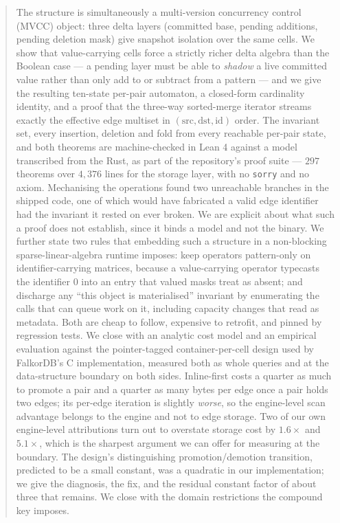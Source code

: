 \documentclass[11pt,a4paper]{article}
\theoremstyle{plain}
\theoremstyle{definition}
\theoremstyle{remark}
\begin{document}
\begin{abstract}
The structure is simultaneously a multi-version concurrency control (MVCC)
object: three delta layers (committed base, pending additions, pending
deletion mask) give snapshot isolation over the same cells. We show that
value-carrying cells force a strictly richer delta algebra than the
Boolean case --- a pending layer must be able to \emph{shadow} a live
committed value rather than only add to or subtract from a pattern --- and we
give the resulting ten-state per-pair automaton, a closed-form cardinality
identity, and a proof that the three-way sorted-merge iterator streams
exactly the effective edge multiset in $(\text{src},\text{dst},\text{id})$
order. The invariant set, every insertion, deletion and fold from every
reachable per-pair state, and both theorems are machine-checked in Lean 4
against a model transcribed from the Rust, as part of the repository's proof
suite --- $297$ theorems over $4{,}376$ lines for the storage layer, with no
\texttt{sorry} and no axiom. Mechanising the operations found two unreachable
branches in the shipped code, one of which would have fabricated a valid edge
identifier had the invariant it rested on ever broken. We are
explicit about what such a proof does not establish, since it binds a model and
not the binary. We further state two rules that embedding such a
structure in a non-blocking sparse-linear-algebra runtime imposes: keep
operators pattern-only on identifier-carrying matrices, because a
value-carrying operator typecasts the identifier $0$ into an entry that valued
masks treat as absent; and discharge any ``this object is materialised''
invariant by enumerating the calls that can queue work on it, including
capacity changes that read as metadata. Both are cheap to follow, expensive to
retrofit, and pinned by regression tests. We close with an
analytic cost model and an empirical evaluation against the pointer-tagged
container-per-cell design used by FalkorDB's C implementation, measured both as
whole queries and at the data-structure boundary on both sides. Inline-first
costs a quarter as much to promote a pair and a quarter as many bytes per edge
once a pair holds two edges; its per-edge iteration is slightly \emph{worse}, so the
engine-level scan advantage belongs to the engine and not to edge storage. Two
of our own engine-level attributions turn out to overstate storage cost by
$1.6\times$ and $5.1\times$, which is the sharpest argument we can offer for
measuring at the boundary. The design's distinguishing promotion/demotion
transition, predicted to be a small constant, was a quadratic in our
implementation; we give the diagnosis, the fix, and the residual constant factor
of about three that remains. We close with the domain restrictions the compound
key imposes.
\end{abstract}
\end{document}
